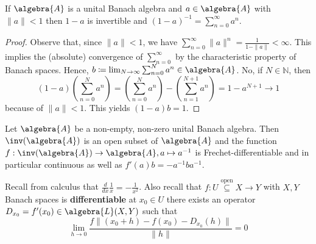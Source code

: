 \documentclass[a4paper]{article}
\begin{document}
\begin{theorem}
	If $\algebra{A}$ is a unital Banach algebra and $a \in \algebra{A}$ with $\|a\| < 1$ then $1 - a$ is invertible and $(1-a)^{-1} = \sum_{n=0}^{\infty} a^n$.
\end{theorem}

\begin{proof}
	Observe that, since $\|a\| < 1$, we have $\sum_{n = 0}^{\infty} \|a\|^n = \frac{1}{1 - \|a\|} < \infty$. This implies the (absolute) convergence of $\sum_{n = 0}^\infty$ by the characteristic property of Banach spaces. Hence, $b \coloneqq \lim_{N \to \infty} \sum_{n = 0}^{N} a^n \in \algebra{A}$. No, if $N \in \mathds{N}$, then
	\begin{equation*}
		(1-a) \left(\sum_{n = 0}^{N} a^n\right) = \left(\sum_{n = 0}^{N} a^n\right) - \left(\sum_{n = 1}^{N + 1} a^n\right) = 1 - a^{N+1} \to 1
	\end{equation*}
	because of $\|a\| < 1$. This yields $(1-a)b = 1$.
\end{proof}

\begin{theorem}
	Let $\algebra{A}$ be a non-empty, non-zero unital Banach algebra. Then $\inv(\algebra{A})$ is an open subset of $\algebra{A}$ and the function $f: \inv(\algebra{A}) \to \algebra{A}, a \mapsto a^{-1}$ is Frechet-differentiable and in particular continuous as well as $f'(a) b = -a^{-1} b a^{-1}$.
\end{theorem}

Recall from calculus that $\frac{d}{dx} \frac{1}{x} = -\frac{1}{x^2}$. Also recall that $f: U \overset{\text{open}}{\subseteq} X \to Y$ with $X,Y$ Banach spaces is \textbf{differentiable} at $x_0 \in U$ there exists an operator $D_{x_0} = f'(x_0) \in \algebra{L}(X,Y)$ such that
\begin{equation*}
	\lim_{h \to 0} \frac{f\|(x_0 + h) - f(x_0) - D_{x_0}(h)\|}{\|h\|} = 0
\end{equation*}
\end{document}
